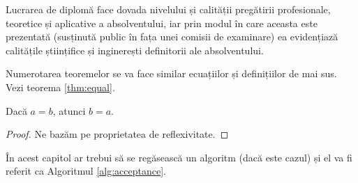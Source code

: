 \begin{definition}
    \label{def:diploma}
    Lucrarea de diplomă face dovada nivelului și calității pregătirii profesionale, teoretice și aplicative a absolventului, iar prin modul în care aceasta este prezentată (susținută public în fața unei comisii de examinare) ea evidențiază calitățile științifice și inginerești definitorii ale absolventului.
\end{definition}

Numerotarea teoremelor se va face similar ecuațiilor și definițiilor de mai sus. Vezi teorema \ref{thm:equal}.

\begin{theorem}
    \label{thm:equal}
    Dacă $a=b$, atunci $b=a$.
\end{theorem}

\begin{proof}
Ne bazăm pe proprietatea de reflexivitate.
\end{proof}

\textcolor{gray}{\lipsum}

În acest capitol ar trebui să se regăsească un algoritm (dacă este cazul) și el va fi referit ca Algoritmul \ref{alg:acceptance}.

